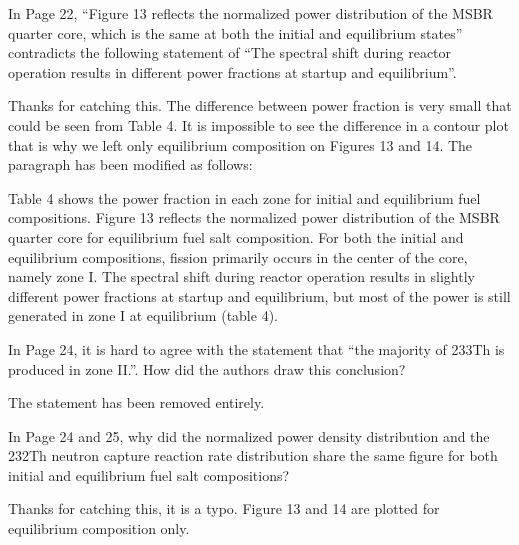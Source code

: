 \documentclass[answers,11pt]{exam}
\begin{document}
\begin{questions}
        \question  In Page 22, ``Figure 13 reflects the normalized power 
        distribution of the MSBR quarter core, which is the same at both the 
        initial and equilibrium states'' contradicts the following statement of 
        ``The spectral shift during reactor operation results in different power 
        fractions at startup and equilibrium''.
        \begin{solution}
                Thanks for catching this. The difference between power fraction
                 is very small that could be seen from Table 4. It is impossible
                  to see the difference in a contour plot that is why we left only 
                 equilibrium composition on Figures 13 and 14. The paragraph has 
                 been modified as follows:
                 
                 Table 4 shows the power fraction in each zone for initial and 
                 equilibrium fuel compositions. Figure 13 reflects the normalized 
                 power distribution of the MSBR quarter core for equilibrium 
                 fuel salt composition. For both the initial and equilibrium 
                 compositions, fission primarily occurs in the center of the core, 
                 namely zone I. The spectral shift during reactor operation results 
                 in slightly different power fractions at startup and equilibrium, 
                 but most of the power is still generated in zone I at equilibrium 
				 (table 4).                  
                   
        \end{solution}

        \question  In Page 24, it is hard to agree with the statement that ``the 
        majority of 233Th is produced in zone II.''. How did the authors draw 
        this conclusion?
        \begin{solution}
                The statement has been removed entirely.
        \end{solution}

        \question  In Page 24 and 25, why did the normalized power density 
        distribution and the 232Th neutron capture reaction rate distribution 
        share the same figure for both initial and equilibrium fuel salt 
        compositions?
        \begin{solution}
                Thanks for catching this, it is a typo. Figure 13 and 14 are plotted 
                for equilibrium composition only.            	    
        \end{solution}


\end{questions}
\end{document}
